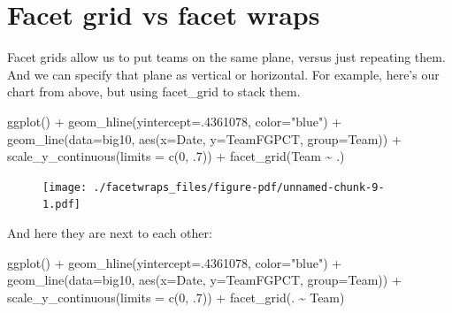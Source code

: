 \documentclass[
  letterpaper,
  DIV=11,
  numbers=noendperiod]{scrreprt}
\newenvironment{Shaded}{\begin{snugshade}}{\end{snugshade}}
\newcommand{\AttributeTok}[1]{\textcolor[rgb]{0.40,0.45,0.13}{#1}}
\newcommand{\DecValTok}[1]{\textcolor[rgb]{0.68,0.00,0.00}{#1}}
\newcommand{\FunctionTok}[1]{\textcolor[rgb]{0.28,0.35,0.67}{#1}}
\newcommand{\NormalTok}[1]{\textcolor[rgb]{0.00,0.23,0.31}{#1}}
\newcommand{\SpecialCharTok}[1]{\textcolor[rgb]{0.37,0.37,0.37}{#1}}
\newcommand{\StringTok}[1]{\textcolor[rgb]{0.13,0.47,0.30}{#1}}
\begin{document}
\hypertarget{facet-grid-vs-facet-wraps}{%
\section{Facet grid vs facet wraps}\label{facet-grid-vs-facet-wraps}}

Facet grids allow us to put teams on the same plane, versus just
repeating them. And we can specify that plane as vertical or horizontal.
For example, here's our chart from above, but using facet\_grid to stack
them.

\begin{Shaded}
\begin{Highlighting}[]
\FunctionTok{ggplot}\NormalTok{() }\SpecialCharTok{+} 
  \FunctionTok{geom\_hline}\NormalTok{(}\AttributeTok{yintercept=}\NormalTok{.}\DecValTok{4361078}\NormalTok{, }\AttributeTok{color=}\StringTok{"blue"}\NormalTok{) }\SpecialCharTok{+} 
  \FunctionTok{geom\_line}\NormalTok{(}\AttributeTok{data=}\NormalTok{big10, }\FunctionTok{aes}\NormalTok{(}\AttributeTok{x=}\NormalTok{Date, }\AttributeTok{y=}\NormalTok{TeamFGPCT, }\AttributeTok{group=}\NormalTok{Team)) }\SpecialCharTok{+} 
  \FunctionTok{scale\_y\_continuous}\NormalTok{(}\AttributeTok{limits =} \FunctionTok{c}\NormalTok{(}\DecValTok{0}\NormalTok{, .}\DecValTok{7}\NormalTok{)) }\SpecialCharTok{+} 
  \FunctionTok{facet\_grid}\NormalTok{(Team }\SpecialCharTok{\textasciitilde{}}\NormalTok{ .)}
\end{Highlighting}
\end{Shaded}

\begin{figure}[H]

{\centering \texttt{[image: ./facetwraps\_files/figure-pdf/unnamed-chunk-9-1.pdf]}

}

\end{figure}

And here they are next to each other:

\begin{Shaded}
\begin{Highlighting}[]
\FunctionTok{ggplot}\NormalTok{() }\SpecialCharTok{+} 
  \FunctionTok{geom\_hline}\NormalTok{(}\AttributeTok{yintercept=}\NormalTok{.}\DecValTok{4361078}\NormalTok{, }\AttributeTok{color=}\StringTok{"blue"}\NormalTok{) }\SpecialCharTok{+} 
  \FunctionTok{geom\_line}\NormalTok{(}\AttributeTok{data=}\NormalTok{big10, }\FunctionTok{aes}\NormalTok{(}\AttributeTok{x=}\NormalTok{Date, }\AttributeTok{y=}\NormalTok{TeamFGPCT, }\AttributeTok{group=}\NormalTok{Team)) }\SpecialCharTok{+} 
  \FunctionTok{scale\_y\_continuous}\NormalTok{(}\AttributeTok{limits =} \FunctionTok{c}\NormalTok{(}\DecValTok{0}\NormalTok{, .}\DecValTok{7}\NormalTok{)) }\SpecialCharTok{+} 
  \FunctionTok{facet\_grid}\NormalTok{(. }\SpecialCharTok{\textasciitilde{}}\NormalTok{ Team)}
\end{Highlighting}
\end{Shaded}
\end{document}
